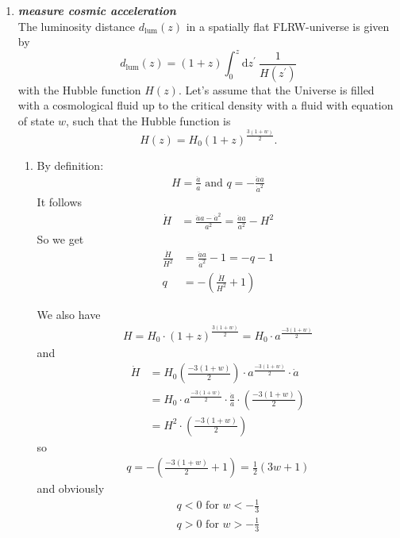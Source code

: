 \documentclass[a4paper,12pt]{article}
\newcommand{\question}[1]{\textbf{\textit{#1}}}
\begin{document}
\begin{enumerate}
		
		\item \question{measure cosmic acceleration}\\
		The luminosity distance $d_\mathrm{lum}(z)$ in a spatially flat FLRW-universe is given by
		\begin{equation}
		d_\mathrm{lum}(z) = (1+z)\int_0^z\mathrm{d}z^\prime\:\frac{1}{H(z^\prime)}
		\end{equation}
		with the Hubble function $H(z)$. Let's assume that the Universe is filled with a cosmological fluid up to the critical density with a fluid with equation of state $w$, such that the Hubble function is
		\begin{equation}
		H(z) = H_0 (1+z)^\frac{3(1+w)}{2}.
		\end{equation}
		\begin{enumerate}
			\item
					By definition:
					\begin{align*}
	H=\frac{\dot{a}}{a} \text{ and } q=-\frac{\ddot{a}a}{\dot{a}^2}
		\end{align*}
		It follows
		\begin{align*}
		\dot{H}&=\frac{\ddot{a}a-\dot{a}^2}{a^2}=\frac{\ddot{a}a}{a^2}-H^2		
		\end{align*}
		So we get
		\begin{align*}
		\frac{\dot{H}}{H^2}&=\frac{\ddot{a}a}{\dot{a}^2}-1=-q-1\\
		q&=-(\frac{\dot{H}}{H^2}+1)	
		\end{align*}
	
		
		We also have
		\begin{align*}
		H=H_0\cdot(1+z)^{\frac{3(1+w)}{2}}=H_0\cdot a^{\frac{-3(1+w)}{2}}
		\end{align*}
		and
		\begin{align*}
		\dot{H}&=H_0\left(\frac{-3(1+w)}{2}\right)\cdot a^{\frac{-3(1+w)}{2}}\cdot \dot{a}\\
			  &=H_0\cdot a^{\frac{-3(1+w)}{2}}\cdot\frac{\dot{a}}{a}\cdot\left(\frac{-3(1+w)}{2}\right)\\
			  &=H^2\cdot \left(\frac{-3(1+w)}{2}\right)
		\end{align*}	
		so
		\begin{align*}
		q=-\left(\frac{-3(1+w)}{2}+1\right)=\frac{1}{2}(3w+1)
		\end{align*}
		and obviously
		\begin{align*}
		q<0 \text{ for } w<-\frac{1}{3}\\
		q>0 \text{ for } w>-\frac{1}{3}
		\end{align*}	
										

\end{enumerate}
\end{enumerate}
\end{document}
